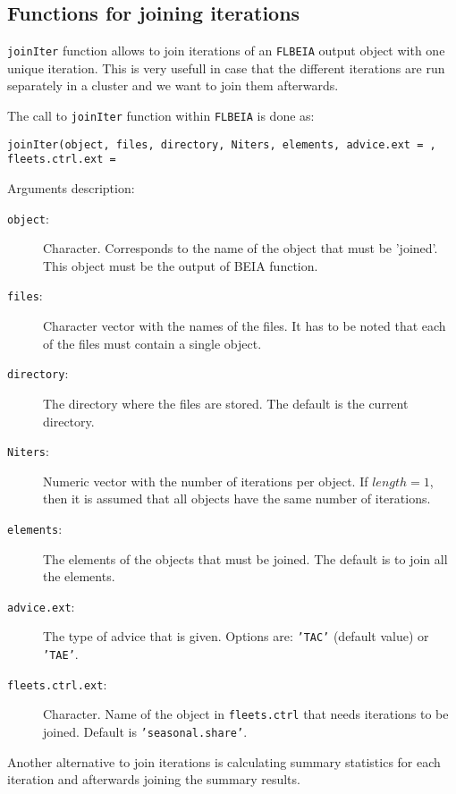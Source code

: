   
\subsection{Functions for joining iterations}

  \texttt{joinIter} function allows to join iterations of an \texttt{FLBEIA} output object with one unique iteration.
  This is very usefull in case that the different iterations are run separately in a cluster and we want to join them afterwards.
  
  The call to \texttt{joinIter} function within \texttt{FLBEIA} is done as:
	
	\begin{center}
		\texttt{joinIter(object, files, directory, Niters, elements, advice.ext = , fleets.ctrl.ext = } 
	\end{center}

  \noindent Arguments description:
	\begin{description}
		\item[\texttt{object}:] Character. Corresponds to the name of the object that must be 'joined'. 
		  This object must be the output of BEIA function.
		\item[\texttt{files}:] Character vector with the names of the files.
		  It has to be noted that each of the files must contain a single object.
		\item[\texttt{directory}:] The directory where the files are stored. The default is the current directory.
		\item[\texttt{Niters}:] Numeric vector with the number of iterations per object. 
		  If $length = 1$, then it is assumed that all objects have the same number of iterations.
		\item[\texttt{elements}:] The elements of the objects that must be joined. The default is to join all the elements.
		\item[\texttt{advice.ext}:] The type of advice that is given. Options are: \texttt{'TAC'} (default value) or \texttt{'TAE'}.
		\item[\texttt{fleets.ctrl.ext}:] Character. Name of the object in \texttt{fleets.ctrl} that needs iterations to be joined.
		  Default is \texttt{'seasonal.share'}.
	\end{description}

  Another alternative to join iterations is calculating summary statistics for each iteration and afterwards joining the summary results.

